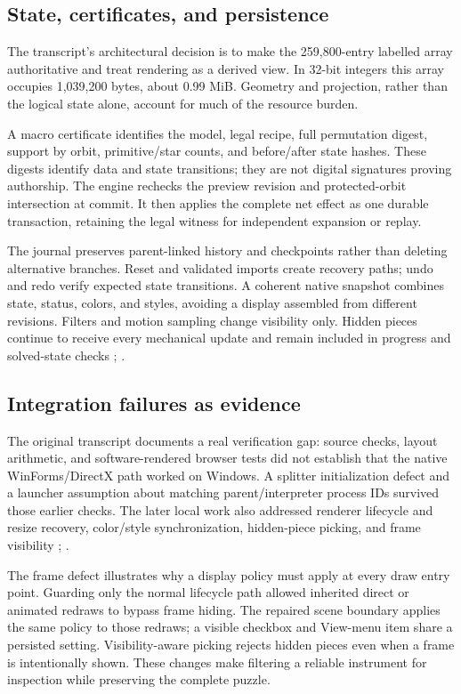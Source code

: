 \documentclass[a4paper,11pt]{article}
\begin{document}
\subsection{State, certificates, and persistence}

The transcript's architectural decision is to make the 259,800-entry labelled array authoritative and treat rendering as a derived view. In 32-bit integers this array occupies 1,039,200 bytes, about 0.99 MiB. Geometry and projection, rather than the logical state alone, account for much of the resource burden.

A macro certificate identifies the model, legal recipe, full permutation digest, support by orbit, primitive/star counts, and before/after state hashes. These digests identify data and state transitions; they are not digital signatures proving authorship. The engine rechecks the preview revision and protected-orbit intersection at commit. It then applies the complete net effect as one durable transaction, retaining the legal witness for independent expansion or replay.

The journal preserves parent-linked history and checkpoints rather than deleting alternative branches. Reset and validated imports create recovery paths; undo and redo verify expected state transitions. A coherent native snapshot combines state, status, colors, and styles, avoiding a display assembled from different revisions. Filters and motion sampling change visibility only. Hidden pieces continue to receive every mechanical update and remain included in progress and solved-state checks \cite[pp.~35--39]{transcript}; \cite{validation}.

\subsection{Integration failures as evidence}

The original transcript documents a real verification gap: source checks, layout arithmetic, and software-rendered browser tests did not establish that the native WinForms/DirectX path worked on Windows. A splitter initialization defect and a launcher assumption about matching parent/interpreter process IDs survived those earlier checks. The later local work also addressed renderer lifecycle and resize recovery, color/style synchronization, hidden-piece picking, and frame visibility \cite[pp.~47--52]{transcript}; \cite{validation}.

The frame defect illustrates why a display policy must apply at every draw entry point. Guarding only the normal lifecycle path allowed inherited direct or animated redraws to bypass frame hiding. The repaired scene boundary applies the same policy to those redraws; a visible checkbox and View-menu item share a persisted setting. Visibility-aware picking rejects hidden pieces even when a frame is intentionally shown. These changes make filtering a reliable instrument for inspection while preserving the complete puzzle.
\end{document}
